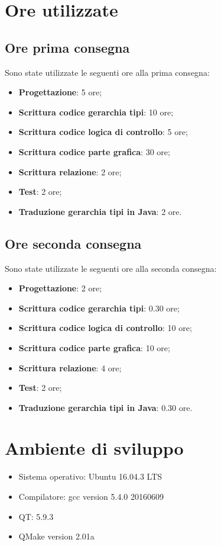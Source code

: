 \documentclass[a4paper,10pt]{article}
\begin{document}
        \section{Ore utilizzate}
        \subsection{Ore prima consegna}
        Sono state utilizzate le seguenti ore alla prima consegna:
        \begin{itemize}
            \item \textbf{Progettazione}: 5 ore;
            \item \textbf{Scrittura codice gerarchia tipi}: 10 ore;
            \item \textbf{Scrittura codice logica di controllo}: 5 ore;
            \item \textbf{Scrittura codice parte grafica}: 30 ore;
            \item \textbf{Scrittura relazione}: 2 ore;
            \item \textbf{Test}: 2 ore;
            \item \textbf{Traduzione gerarchia tipi in Java}: 2 ore.

        \end{itemize}
        \subsection{Ore seconda consegna}
        Sono state utilizzate le seguenti ore alla seconda consegna:
        \begin{itemize}
            \item \textbf{Progettazione}: 2 ore;
            \item \textbf{Scrittura codice gerarchia tipi}: 0.30 ore;
            \item \textbf{Scrittura codice logica di controllo}: 10 ore;
            \item \textbf{Scrittura codice parte grafica}: 10 ore;
            \item \textbf{Scrittura relazione}: 4 ore;
            \item \textbf{Test}: 2 ore;
            \item \textbf{Traduzione gerarchia tipi in Java}: 0.30 ore.

        \end{itemize}
        \section{Ambiente di sviluppo}
        \begin{itemize}
            \item Sistema operativo: Ubuntu 16.04.3 LTS
            \item Compilatore: gcc version 5.4.0 20160609
            \item QT: 5.9.3
            \item QMake version 2.01a
        \end{itemize}
\end{document}
